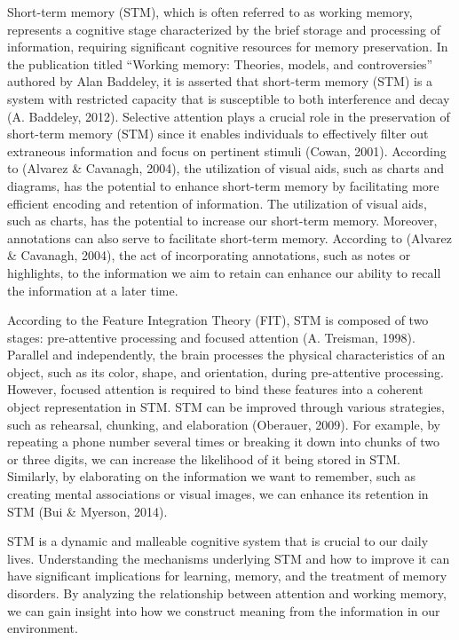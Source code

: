 \documentclass[print]{nuthesis}
\begin{document}
Short-term memory (STM), which is often referred to as working memory, represents a cognitive stage characterized by the brief storage and processing of information, requiring significant cognitive resources for memory preservation.
In the publication titled ``Working memory: Theories, models, and controversies'' authored by Alan Baddeley, it is asserted that short-term memory (STM) is a system with restricted capacity that is susceptible to both interference and decay (A. Baddeley, 2012).
Selective attention plays a crucial role in the preservation of short-term memory (STM) since it enables individuals to effectively filter out extraneous information and focus on pertinent stimuli (Cowan, 2001).
According to (Alvarez \& Cavanagh, 2004), the utilization of visual aids, such as charts and diagrams, has the potential to enhance short-term memory by facilitating more efficient encoding and retention of information.
The utilization of visual aids, such as charts, has the potential to increase our short-term memory.
Moreover, annotations can also serve to facilitate short-term memory.
According to (Alvarez \& Cavanagh, 2004), the act of incorporating annotations, such as notes or highlights, to the information we aim to retain can enhance our ability to recall the information at a later time.

According to the Feature Integration Theory (FIT), STM is composed of two stages: pre-attentive processing and focused attention (A. Treisman, 1998).
Parallel and independently, the brain processes the physical characteristics of an object, such as its color, shape, and orientation, during pre-attentive processing.
However, focused attention is required to bind these features into a coherent object representation in STM.
STM can be improved through various strategies, such as rehearsal, chunking, and elaboration (Oberauer, 2009).
For example, by repeating a phone number several times or breaking it down into chunks of two or three digits, we can increase the likelihood of it being stored in STM.
Similarly, by elaborating on the information we want to remember, such as creating mental associations or visual images, we can enhance its retention in STM (Bui \& Myerson, 2014).

STM is a dynamic and malleable cognitive system that is crucial to our daily lives.
Understanding the mechanisms underlying STM and how to improve it can have significant implications for learning, memory, and the treatment of memory disorders.
By analyzing the relationship between attention and working memory, we can gain insight into how we construct meaning from the information in our environment.
\end{document}
